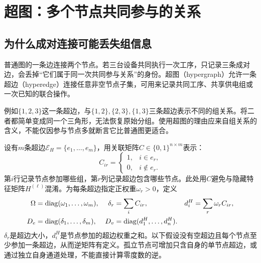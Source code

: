 \section{超图：多个节点共同参与的关系}
\subsection{为什么成对连接可能丢失组信息}
普通图的一条边连接两个节点。若三台设备共同执行一次工序，只记录三条成对边，会丢掉“它们属于同一次共同参与关系”的身份。超图（hypergraph）允许一条超边（hyperedge）连接任意非空节点子集，可用来记录共同工序、共享供电组或一次已知的联合操作。

例如$\{1,2,3\}$这一条超边，与$\{1,2\},\{2,3\},\{1,3\}$三条超边表示不同的组关系。将二者都简单变成同一个三角形，无法恢复原始分组。使用超图的理由应来自组关系的含义，不能仅因参与节点多就断言它比普通图更适合。

设有$m$条超边$\mathcal E_H=\{e_1,\ldots,e_m\}$，用关联矩阵$C\in\{0,1\}^{n\times m}$表示：
\begin{equation}
 C_{ir}=\begin{cases}1,&i\in e_r,\\0,&i\notin e_r.\end{cases}
 \label{eq:graph-hyper-incidence}
\end{equation}
第$i$行记录节点参加哪些组，第$r$列记录超边包含哪些节点。此处用$C$避免与隐藏特征矩阵$H^{(\ell)}$混淆。为每条超边指定正权重$\omega_r>0$，定义
\begin{equation}
 \begin{aligned}
 \Omega&=\operatorname{diag}(\omega_1,\ldots,\omega_m),&
 \delta_r&=\sum_iC_{ir},&
 d_i^H&=\sum_r\omega_rC_{ir},\\
 D_e&=\operatorname{diag}(\delta_1,\ldots,\delta_m),&
 D_v&=\operatorname{diag}(d_1^H,\ldots,d_n^H).
 \end{aligned}
 \label{eq:graph-hyper-degrees}
\end{equation}
$\delta_r$是超边大小，$d_i^H$是节点参加的超边权重之和。以下假设没有空超边且每个节点至少参加一条超边，从而逆矩阵有定义。孤立节点可增加只含自身的单节点超边，或通过独立自身通道处理，不能直接计算零度数的逆。

